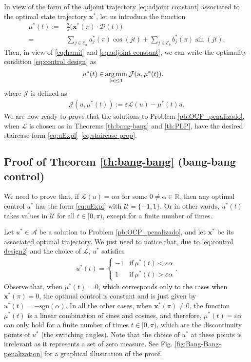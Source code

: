 \documentclass[twocolumn]{autart}    %
\begin{document}
In view of the form of the adjoint trajectory \eqref{eq:adjoint constant} associated to the optimal state trajectory $\bm{x}^\ast$, let us introduce the function
\begin{align}\label{eq:m ast}
	\mu^\ast (t) := & \frac 2\pi \big(\bm{x}^*(\pi) \cdot \bm{\mathcal{D}}(t)\big) 
	\\[5pt]
	= & \sum_{j \in \mathcal{E}_a} a^*_j (\pi) \cos(jt) + \sum_{j \in \mathcal{E}_b} b^*_j (\pi) \sin(jt). \nonumber
\end{align}
Then, in view of \eqref{eq:hamil} and \eqref{eq:adjoint constant}, we can write the optimality condition \eqref{eq:control design} as
\begin{align}\label{eq:control design2}
	u^\ast(t)  \in & \operatorname*{arg\,min}_{|u|\leq 1}  \mathcal{J} (u,\mu^\ast(t)).  
\end{align}    
where $\mathcal{J}$ is defined as
\begin{align}\label{eq:functionalJ}
	\mathcal{J} (u,\mu^\ast(t)):= \varepsilon \mathcal{L}(u) - \mu^\ast(t) u .
\end{align}    
We are now ready to prove that the solutions to Problem \ref{pb:OCP_penalizado}, when $\mathcal{L}$ is chosen as in Theorems \ref{th:bang-bang} and \ref{th:PLP}, have the desired staircase form \eqref{eq:uExpl}--\eqref{eq:staircase prop}.
\subsection{Proof of Theorem \ref{th:bang-bang} (bang-bang control)}\label{sec: proof:bang-bang}

We need to prove that, if $\mathcal{L}(u) = \alpha u$ for some $0 \neq \alpha\in \mathbb{R}$, then any optimal control $u^\ast$ has the form \eqref{eq:uExpl} with $\mathcal{U}=\{-1,1\}$. Or in other words,  $u^\ast(t)$ takes values in $\mathcal{U}$ for all $t\in [0,\pi)$, except for a finite number of times.

Let $u^\ast\in \mathcal{A}$ be a solution to Problem \ref{pb:OCP_penalizado}, and let $\bm{x}^\ast$ be its associated optimal trajectory. We just need to notice that, due to \eqref{eq:control design2} and the choice of $\mathcal{L}$, $u^\ast$ satisfies
\begin{align*}
	u^\ast (t) = \begin{cases}
		-1 & \text{if} \   \mu^\ast(t) < \varepsilon\alpha 
		\\
		1 & \text{if} \  \mu^\ast(t) > \varepsilon\alpha
	\end{cases}.
\end{align*}
Observe that, when $\mu^\ast(t) = 0$, which corresponds only to the cases when $\bm{x}^\ast(\pi) = 0$, the optimal control is constant and is just given by  $u^\ast (t) =  -\text{sgn} (\alpha)$. In all the other cases, when $\bm{x}^\ast(\pi)\neq 0$, the function $\mu^\ast(t)$ is a linear combination of sines and cosines, and therefore, $\mu^\ast (t) = \varepsilon\alpha$ can only hold for a finite number of times $t\in [0,\pi)$, which are the discontinuity points of $u^\ast$ (the switching angles). Note that the choice of $u^\ast$ at these points is irrelevant as it represents a set of zero measure.  See Fig. \ref{fig:Bang-Bang-penalization} for a graphical illustration of the proof.
\end{document}
